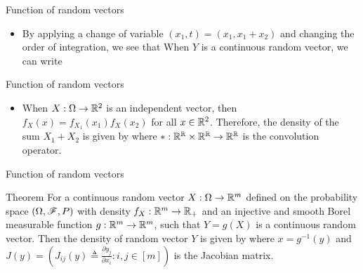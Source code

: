 \documentclass[12pt,aspectratio=169]{beamer}
\begin{document}
\begin{frame}{Function of random vectors}
\begin{Example}
\begin{itemize}
\item <1-> By applying a change of variable $(x_1, t)= (x_1, x_1 + x_2)$ and changing the order of integration, 
we see that 
When $Y$ is a continuous random vector, we can write 
\end{itemize}
\end{Example}
\end{frame}

\begin{frame}{Function of random vectors}
\begin{Example}
\begin{itemize}
\item <1-> When $X: \Omega \to \mathbb{R}^2$ is an independent vector, then $f_X(x) = f_{X_1}(x_1)f_X(x_2)$ for all $x\in\mathbb{R}^2$. 
Therefore, the density of the sum $X_1+X_2$ is given by  
where $\ast: \mathbb{R}^{\mathbb{R}} \times \mathbb{R}^{\mathbb{R}} \to \mathbb{R}^{\mathbb{R}}$ is the convolution operator. 
\end{itemize}
\end{Example}
\end{frame}

\begin{frame}{Function of random vectors}
\begin{block}{Theorem}
For a continuous random vector $X:\Omega \to \mathbb{R}^m$ defined on the probability space $(\Omega, \mathscr{F}, P)$ with density $f_X: \mathbb{R}^m \to \mathbb{R}_+$ and an injective and smooth Borel measurable function $g: \mathbb{R}^m \to \mathbb{R}^m$, 
such that $Y=g(X)$ is a continuous random vector. 
Then the density of random vector $Y$ is given by 
where $x=g^{-1}(y)$ and $J(y)= (J_{ij}(y) \triangleq \frac{\partial y_j}{\partial x_i}: i,j\in [m])$ is the Jacobian matrix.  
\end{block} 
\end{frame}
\end{document}
